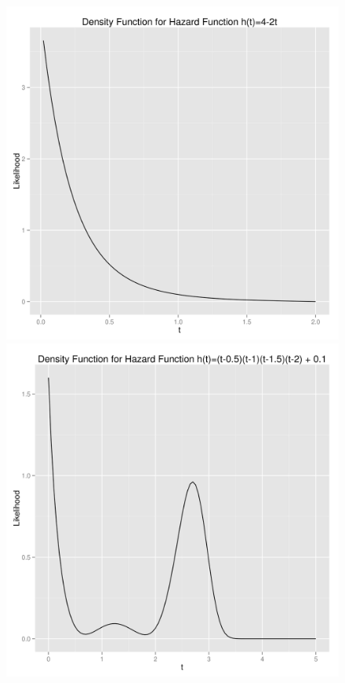 \documentclass[letter]{article}
\begin{document}
\begin{figure}[H]
\centering
\includegraphics[scale=.33]{3_decreasing.png}
\includegraphics[scale=.33]{3_wshape.png}
\end{figure}
\end{document}

